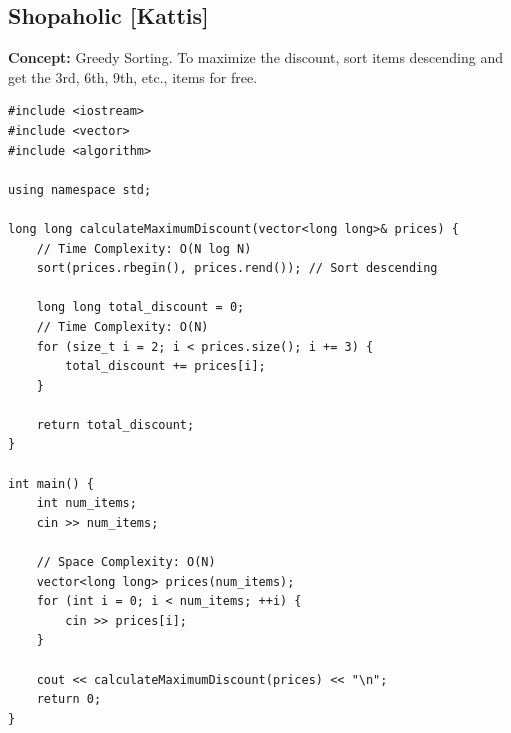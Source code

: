 \subsection{Shopaholic [Kattis]}
\textbf{Concept:} Greedy Sorting. To maximize the discount, sort items descending and get the 3rd, 6th, 9th, etc., items for free.
\begin{lstlisting}
#include <iostream>
#include <vector>
#include <algorithm>

using namespace std;

long long calculateMaximumDiscount(vector<long long>& prices) {
    // Time Complexity: O(N log N)
    sort(prices.rbegin(), prices.rend()); // Sort descending
    
    long long total_discount = 0;
    // Time Complexity: O(N)
    for (size_t i = 2; i < prices.size(); i += 3) {
        total_discount += prices[i];
    }
    
    return total_discount;
}

int main() {
    int num_items;
    cin >> num_items;
    
    // Space Complexity: O(N)
    vector<long long> prices(num_items);
    for (int i = 0; i < num_items; ++i) {
        cin >> prices[i];
    }
    
    cout << calculateMaximumDiscount(prices) << "\n";
    return 0;
}
\end{lstlisting}

